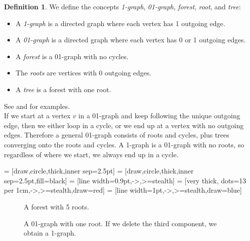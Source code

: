 \documentclass[a4paper, 11pt]{article}
\theoremstyle{definition}
\newtheorem{definition}{Definition}[section]
\begin{document}
\pagebreak

\begin{definition}
We define the concepts \emph{1-graph}, \emph{01-graph}, \emph{forest}, \emph{root}, and \emph{tree}:
 \begin{itemize}
  \item A \emph{1-graph} is a directed graph where each vertex has 1 outgoing edge.
  \item A \emph{01-graph} is a directed graph where each vertex has 0 or 1 outgoing edges.
  \item A \emph{forest} is a 01-graph with no cycles.
  \item The \emph{roots} are vertices with 0 outgoing edges.
  \item A \emph{tree} is a forest with one root.
 \end{itemize}
\end{definition}

See  and  for examples. \\

\noindent If we start at a vertex $v$ in a 01-graph and keep following the unique outgoing edge, then we either loop in a cycle, or we end up at a vertex with no outgoing edges. Therefore a general 01-graph consists of roots and cycles, plus trees converging onto the roots and cycles. A 1-graph is a 01-graph with no roots, so regardless of where we start, we always end up in a cycle.


 = [draw,circle,thick,inner sep=2.5pt]
 = [draw,circle,thick,inner sep=2.5pt,fill=black]
 = [line width=0.9pt,->,>=stealth]
 = [very thick, dots=13 per 1cm,->,>=stealth,draw=red]
 = [line width=1pt,->,>=stealth,draw=blue]

\begin{figure}
  \centering
  \begin{tikzpicture}[spring layout,node distance=30pt]
    
  \end{tikzpicture}
  \caption{A forest with 5 roots.}
  \label{fig:forest}
\end{figure}

\begin{figure}
  \centering
  \begin{tikzpicture}[spring layout,node distance=30pt, random seed=1]
    
  \end{tikzpicture}
  \caption{A 01-graph with one root. If we delete the third component, we obtain a 1-graph.}
  \label{fig:graph}
\end{figure}
\end{document}
